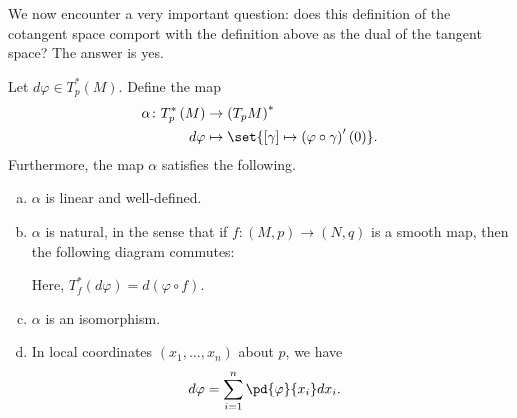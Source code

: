 \documentclass[10pt]{mypackage}
\begin{document}
We now encounter a very important question: does this definition of the cotangent space comport with the definition above as the dual of the tangent space? The answer is yes.
\begin{proposition}
  Let $d\varphi\in T_p^{\ast}\left( M \right)$. Define the map
  \begin{align*}
    \alpha\colon T_p^{\ast}\left( M \right) &\rightarrow \left( T_pM \right)^{\ast}\\
    d\varphi &\mapsto \set{ \left[ \gamma \right]\mapsto \left( \varphi\circ \gamma \right)'\left( 0 \right) }.
  \end{align*}
  Furthermore, the map $\alpha$ satisfies the following.
  \begin{enumerate}[(a)]
    \item $\alpha$ is linear and well-defined.
    \item $\alpha$ is natural, in  the sense that if $f\colon \left( M,p \right)\rightarrow \left( N,q \right)$ is a smooth map, then the following diagram commutes:
      \begin{center}
      \end{center}
      Here, $T_f^{\ast}\left( d\varphi \right) = d\left( \varphi \circ f \right)$.
    \item $\alpha$ is an isomorphism.
    \item In local coordinates $\left( x_1,\dots,x_n \right)$ about $p$, we have
      \begin{align*}
        d\varphi &= \sum_{i=1}^{n} \pd{\varphi}{x_i}dx_i.
      \end{align*}
  \end{enumerate}
\end{proposition}
\end{document}
